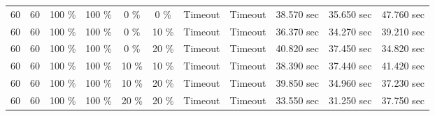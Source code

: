 \documentclass{article}
\begin{document}
\begin{longtable}[]{@{}ccccccccccc@{}}
60 & 60 & 100 \% & 100 \% & 0 \% & 0 \% & Timeout & Timeout & 38.570 sec & 35.650 sec & 47.760 sec \\
60 & 60 & 100 \% & 100 \% & 0 \% & 10 \% & Timeout & Timeout & 36.370 sec & 34.270 sec & 39.210 sec \\
60 & 60 & 100 \% & 100 \% & 0 \% & 20 \% & Timeout & Timeout & 40.820 sec & 37.450 sec & 34.820 sec \\
60 & 60 & 100 \% & 100 \% & 10 \% & 10 \% & Timeout & Timeout & 38.390 sec & 37.440 sec & 41.420 sec \\
60 & 60 & 100 \% & 100 \% & 10 \% & 20 \% & Timeout & Timeout & 39.850 sec & 34.960 sec & 37.230 sec \\
60 & 60 & 100 \% & 100 \% & 20 \% & 20 \% & Timeout & Timeout & 33.550 sec & 31.250 sec & 37.750 sec
\end{longtable}
\end{document}
